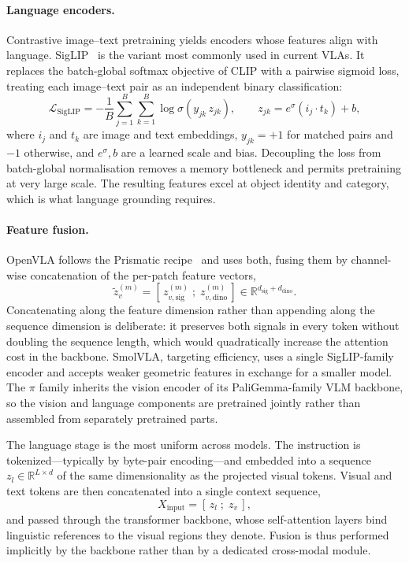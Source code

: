 \documentclass[english,12pt,a4paper,pdftex,elec,utf8]{aaltothesis}
\begin{document}
\paragraph{Language encoders.}
Contrastive image--text pretraining yields encoders whose features align with language. SigLIP~\cite{zhai2023sigmoid} is the variant most commonly used in current VLAs. It replaces the batch-global softmax objective of CLIP \citep{radford2021learning} with a pairwise sigmoid loss, treating each image--text pair as an independent binary classification:
\begin{equation}
\mathcal{L}_{\mathrm{SigLIP}}
= -\frac{1}{B}\sum_{j=1}^{B}\sum_{k=1}^{B}
\log \sigma\!\left( y_{jk}\, z_{jk} \right),
\qquad
z_{jk} = e^{\sigma}(i_j \cdot t_k) + b,
\end{equation}
where $i_j$ and $t_k$ are image and text embeddings, $y_{jk} = +1$ for matched pairs and $-1$ otherwise, and $e^{\sigma}, b$ are a learned scale and bias. Decoupling the loss from batch-global normalisation removes a memory bottleneck and permits pretraining at very large scale. The resulting features excel at object identity and category, which is what language grounding requires.


\paragraph{Feature fusion.}
OpenVLA follows the Prismatic recipe~\cite{karamcheti2024prismatic} and uses both, fusing them by channel-wise concatenation of the per-patch feature vectors,
\begin{equation}
\tilde{z}_v^{(m)} =
\left[\, z_{v,\mathrm{sig}}^{(m)} \; ; \; z_{v,\mathrm{dino}}^{(m)} \,\right]
\in \mathbb{R}^{d_{\mathrm{sig}} + d_{\mathrm{dino}}}.
\end{equation}
Concatenating along the feature dimension rather than appending along the sequence dimension is deliberate: it preserves both signals in every token without doubling the sequence length, which would quadratically increase the attention cost in the backbone. SmolVLA, targeting efficiency, uses a single SigLIP-family encoder and accepts weaker geometric features in exchange for a smaller model. The $\pi$ family inherits the vision encoder of its PaliGemma-family VLM backbone, so the vision and language components are pretrained jointly rather than assembled from separately pretrained parts.

The language stage is the most uniform across models. The instruction is tokenized---typically by byte-pair encoding---and embedded into a sequence $z_l \in \mathbb{R}^{L \times d}$ of the same dimensionality as the projected visual tokens. Visual and text tokens are then concatenated into a single context sequence, \begin{equation}
X_{\mathrm{input}} = [\, z_l \; ; \; z_v \,],
\end{equation}
and passed through the transformer backbone, whose self-attention layers bind linguistic references to the visual regions they denote. Fusion is thus performed implicitly by the backbone rather than by a dedicated cross-modal module.
\end{document}
